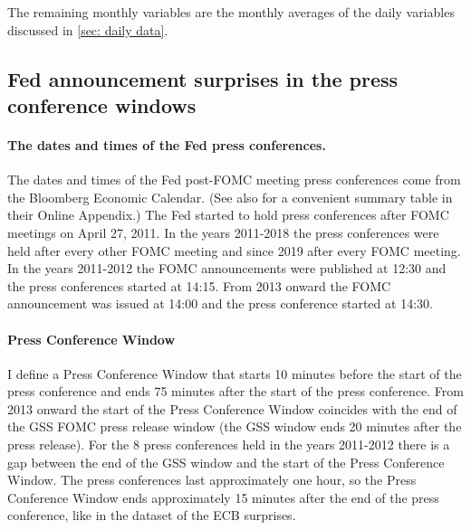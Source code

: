 \documentclass[a4paper,12pt]{article}
\begin{document}
The remaining monthly variables are the monthly averages of the daily variables discussed in \ref{sec: daily data}.

\subsection{Fed announcement surprises in the press conference windows}\label{sec: Fed press conf}


\paragraph{The dates and times of the Fed press conferences.} 
The dates and times of the Fed post-FOMC meeting press conferences come from the Bloomberg Economic Calendar.
(See also \cite{Bodilsen_etal_2021} for a convenient summary table in their Online Appendix.)
The Fed started to hold press conferences after FOMC meetings on April 27, 2011. 
In the years 2011-2018 the press conferences were held after every other FOMC meeting
and since 2019 after every FOMC meeting.
In the years 2011-2012 the FOMC announcements were published at 12:30 and the press
conferences started at 14:15.
From 2013 onward the FOMC announcement was issued at 14:00 and the press conference started at 14:30.

\paragraph{Press Conference Window} 
I define a Press Conference Window that starts 10 minutes before the start of the press conference
and ends 75 minutes after the start of the press conference.
From 2013 onward the start of the Press Conference Window coincides with the end of the GSS FOMC press release window (the GSS window ends 20 minutes after the press release).
For the 8 press conferences held in the years 2011-2012 there is a gap 
between the end of the GSS window and the start of the Press Conference Window.
The press conferences last approximately one hour, so the Press Conference Window
ends approximately 15 minutes after the end of the press conference,
like in the \cite{Altavilla_etal_2019} dataset of the ECB surprises.
\end{document}
